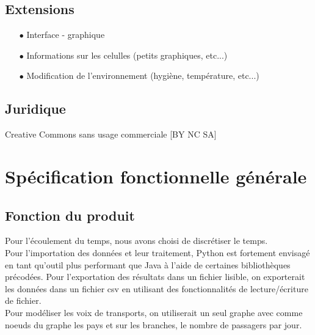 \documentclass[12pt,a4paper]{report}
\begin{document}
\subsection*{Extensions}
\begin{flushleft}
  \begin{itemize}
	\item[$\bullet$] Interface - graphique 
	\item[$\bullet$] Informations sur les celulles (petits graphiques, etc...) 
	\item[$\bullet$] Modification de l'environnement (hygiène, température, etc...) 
  \end{itemize}
\end{flushleft}

\subsection*{Juridique}
\begin{flushleft}
Creative Commons sans usage commerciale [BY NC SA]
\end{flushleft}

\section*{Spécification fonctionnelle générale}

\subsection*{Fonction du produit}
	\begin{flushleft}
	Pour l'écoulement du temps, nous avons choisi de discrétiser le temps. \\
	Pour l'importation des données et leur traitement, Python est fortement envisagé en tant qu'outil plus performant que Java à l'aide de certaines bibliothèques précodées.
	Pour l'exportation des résultats dans un fichier lisible, on exporterait les données dans un fichier csv en utilisant des fonctionnalités de lecture/écriture de fichier.\\
	Pour modéliser les voix de transports, on utiliserait un seul graphe avec comme noeuds du graphe les pays et sur les branches, le nombre de passagers par jour.
	\end{flushleft}
\end{document}
